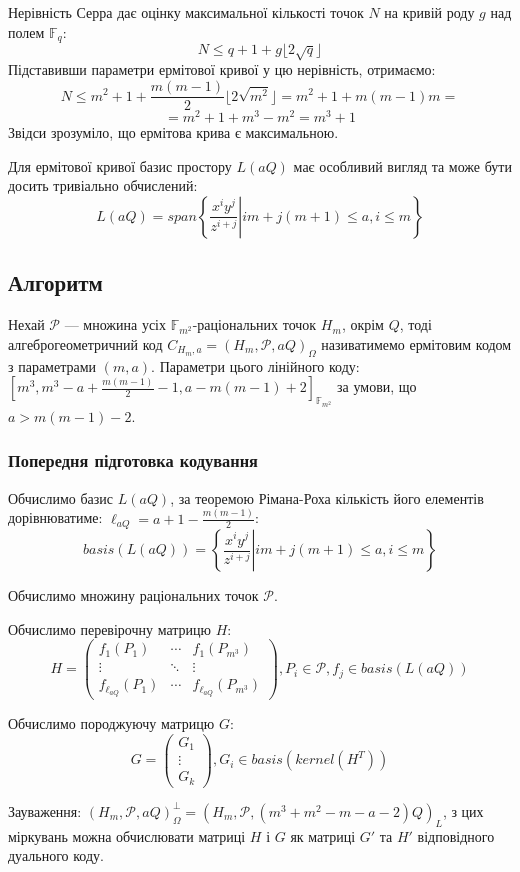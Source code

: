 \documentclass[a4paper,14pt,oneside]{extarticle}
\begin{document}
Нерівність Серра дає оцінку максимальної кількості точок $N$ на кривій роду $g$ над полем $\mathbb{F}_q$:
$$ N \le q+1+g \lfloor 2 \sqrt{q} \rfloor $$
Підставивши параметри ермітової кривої у цю нерівність, отримаємо:
$$ N \le m^2 + 1 + \frac{m(m-1)}{2} \lfloor 2 \sqrt{m^2} \rfloor= m^2 + 1 + m(m-1)m = $$
$$ = m^2 + 1 + m^3 - m^2 = m^3 + 1$$
Звідси зрозуміло, що ермітова крива є максимальною.

Для ермітової кривої базис простору $L(aQ)$ має особливий вигляд та може бути досить тривіально обчислений:
$$ L(aQ) = span \left. \left \{ \frac{x^i y^j}{z^{i+j}} \right | i m + j (m + 1) \le a, i \le m \right \} $$


\subsection{Алгоритм}
Нехай $\mathcal{P}$ --- множина усіх $\mathbb{F}_{m^2}$-раціональних точок $H_m$, окрім $Q$, тоді алгеброгеометричний код 
$C_{H_{m}, a} = (H_m, \mathcal{P}, aQ)_\Omega$ називатимемо ермітовим кодом з параметрами $(m, a)$. Параметри цього лінійного коду:
$[m^3, m^3 - a + \frac{m(m-1)}{2} - 1, a - m(m-1) + 2]_{\mathbb{F}_{m^2}}$ за умови, що $ a > m(m-1) - 2$.
\subsubsection{Попередня підготовка кодування}
Обчислимо базис $L(aQ)$, за теоремою Рімана-Роха кількість його елементів дорівнюватиме: $\ell_{aQ}=a+1-\frac{m(m-1)}{2}$:
$$ basis(L(aQ)) = \left. \left \{ \frac{x^i y^j}{z^{i+j}} \right | i m + j (m + 1) \le a, i \le m \right \} $$

Обчислимо множину раціональних точок $\mathcal{P}$.

Обчислимо перевірочну матрицю $H$:
$$ 
H = 
\begin{pmatrix}
 f_1 (P_1) & \cdots & f_1(P_{m^3}) \\
 \vdots & \ddots & \vdots \\
 f_{\ell_{aQ}} (P_1) & \cdots & f_{\ell_{aQ}}(P_{m^3})
\end{pmatrix}, P_i \in \mathcal{P}, f_j \in basis(L(aQ))
$$

Обчислимо породжуючу матрицю $G$:
$$
G =
\begin{pmatrix}
    G_1 \\
    \vdots \\
    G_k
\end{pmatrix}, G_i \in basis(kernel(H^T))
$$

Зауваження: $(H_m, \mathcal{P}, aQ)_\Omega^\perp = (H_m, \mathcal{P}, (m^3+m^2-m-a-2)Q)_L$, з цих міркувань можна обчислювати матриці $H$ і $G$ як матриці 
$G'$ та $H'$ відповідного дуального коду.
\end{document}

